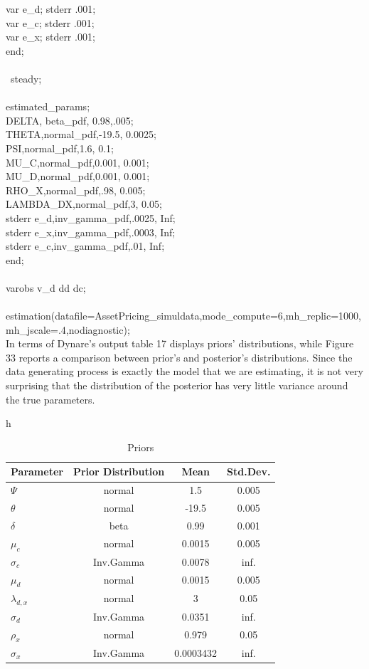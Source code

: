 \documentclass[a4paper,12pt]{scrartcl} %
\begin{document}
{var e\_d; stderr .001;\\
var e\_c; stderr .001;\\
var e\_x; stderr .001;\\
end;\\
\\\
steady;\\
\\
estimated\_params;\\
DELTA, beta\_pdf, 0.98,.005;\\
THETA,normal\_pdf,-19.5, 0.0025;\\
PSI,normal\_pdf,1.6, 0.1;\\
MU\_C,normal\_pdf,0.001, 0.001;\\
MU\_D,normal\_pdf,0.001, 0.001;\\
RHO\_X,normal\_pdf,.98, 0.005;\\
LAMBDA\_DX,normal\_pdf,3, 0.05;\\
stderr e\_d,inv\_gamma\_pdf,.0025, Inf;\\
stderr e\_x,inv\_gamma\_pdf,.0003, Inf;\\
stderr e\_c,inv\_gamma\_pdf,.01, Inf;\\
end;\\
\\
varobs v\_d dd dc;\\
\\
estimation(datafile=AssetPricing\_simuldata,mode\_compute=6,mh\_replic=1000,mh\_jscale=.4,nodiagnostic);}\\

In terms of Dynare’s output table 17 displays priors’ distributions, while Figure 33 reports a comparison between prior’s and posterior’s distributions. Since the data generating process is exactly the model that we are estimating, it is not very surprising that the distribution of the posterior has very little variance around the true parameters.

\begin{table}{h}
\centering
\caption{Priors}\label{17}
\begin{tabular}{lccc}
\hline
Parameter&Prior Distribution&Mean&Std.Dev.\\
\hline
$\Psi$&normal&1.5&0.005\\
$\theta$&normal&-19.5&0.005\\
$\delta$&beta&0.99&0.001\\
$\mu_c$&normal&0.0015&0.005\\
$\sigma_c$&Inv.Gamma&0.0078&inf.\\
$\mu_d$&normal&0.0015&0.005\\
$\lambda_{d,x}$&normal&3&0.05\\
$\sigma_d$&Inv.Gamma&0.0351&inf.\\
$\rho_x$&normal&0.979&0.05\\
$\sigma_x$&Inv.Gamma&0.0003432&inf.\\
\hline
\end{tabular}
\end{table}
\end{document}
